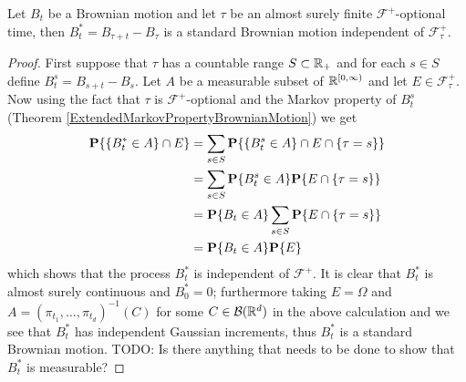 \begin{thm}\label{StrongMarkovPropertyBrownianMotion}Let $B_t$ be a
  Brownian motion and let $\tau$ be an almost surely finite $\mathcal{F}^+$-optional
  time, then $B^*_t = B_{\tau + t} - B_\tau$ is a standard Brownian
  motion independent of $\mathcal{F}^+_\tau$.
\end{thm}
\begin{proof}
First suppose that $\tau$ has a countable range $S \subset \mathbb{R}_+$
and for each $s \in S$ define $B^s_t = B_{s+t} - B_s$.
Let $A$ be a
measurable subset of $\mathbb{R}^{[0,\infty)}$ and let $E \in
\mathcal{F}^+_\tau$.  Now using the fact that $\tau$ is
$\mathcal{F}^+$-optional and the Markov property of $B^s_t$ (Theorem
\ref{ExtendedMarkovPropertyBrownianMotion}) we get
\begin{align*}
\textbf{P}\{\lbrace B^*_t \in A \rbrace \cap E\} &= \sum_{s \in S}
\textbf{P}\{ \lbrace B^s_t
  \in A \rbrace \cap E \cap \lbrace \tau = s \rbrace \} \\
&=\sum_{s \in S} \textbf{P}\{ B^s_t
  \in A \} \textbf{P}\{ E \cap \lbrace \tau = s \rbrace \} \\
&=\textbf{P}\{ B_t
  \in A \} \sum_{s \in S} \textbf{P}\{ E \cap \lbrace \tau = s \rbrace \} \\
&= \textbf{P}\{ B_t  \in A \} \textbf{P}\{ E \} 
\end{align*}
which shows that the process $B^*_t$ is independent of
$\mathcal{F}^+$.  
It is clear that $B^*_t$ is almost surely continuous and $B^*_0 = 0$;
furthermore taking $E = \Omega$ and $A = (\pi_{t_1}, \dotsc,
\pi_{t_d})^{-1}(C)$ for some $C \in \mathcal{B}(\mathbb{R}^d)$ in the above calculation and we see
that $B^*_t$ has independent Gaussian increments, thus $B^*_t$ is a
standard Brownian motion.  TODO:  Is there anything that needs to be
done to show that $B^*_t$ is measurable?


\end{proof}

